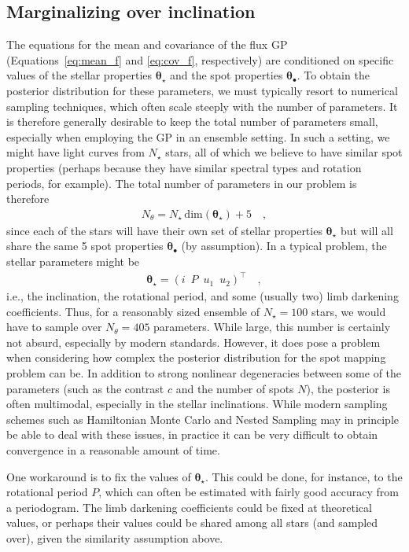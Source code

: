 \documentclass[modern]{aastex62}
\begin{document}
\subsection{Marginalizing over inclination}
\label{sec:inclination}
%
The equations for the mean and covariance of the flux GP
(Equations~\ref{eq:mean_f} and \ref{eq:cov_f}, respectively) are conditioned
on specific values of the stellar properties $\pmb{\theta}_\star$ and the
spot properties $\pmb{\theta}_\bullet$. To obtain the posterior distribution
for these parameters, we must typically resort to numerical sampling techniques,
which often scale steeply with the number of parameters. It is therefore generally
desirable to keep the total number of parameters small, especially when
employing the GP in an ensemble setting.
In such a setting, we might have light curves from $N_\star$ stars, all of which
we believe to have similar spot properties (perhaps because they have
similar spectral types and rotation periods, for example).
The total number of parameters in our problem is therefore
%
\begin{align}
    N_\theta = N_\star \, \mathrm{dim}(\pmb{\theta}_\star) + 5
    \quad,
\end{align}
%
since each of the stars will have their own set of stellar properties
$\pmb{\theta}_\star$ but will all share the same 5 spot properties
$\pmb{\theta}_\bullet$ (by assumption).
In a typical problem, the stellar parameters might be
%
\begin{align}
    \pmb{\theta}_\star =
    \left(
    i \,\,\,
    P \,\,\,
    u_1 \,\,\,
    u_2
    \right)^\top
    \quad,
\end{align}
%
i.e., the inclination, the rotational period, and some (usually two) limb
darkening coefficients. Thus, for a reasonably sized ensemble of $N_\star=100$
stars, we would have to sample over $N_\theta = 405$ parameters.
While large, this number is certainly not absurd, especially by modern standards.
However, it does pose
a problem when considering how complex the posterior distribution for the
spot mapping problem can be. In addition to strong nonlinear degeneracies
between some of the parameters (such as the contrast $c$ and the
number of spots $N$), the posterior is often multimodal, especially in the
stellar inclinations. While modern sampling schemes such as Hamiltonian
Monte Carlo and Nested Sampling may in principle be able to deal with these
issues, in practice it can be very difficult to obtain convergence in a
reasonable amount of time.

One workaround is to fix the values of $\pmb{\theta}_\star$. This could be done,
for instance, to the rotational period $P$, which can often be estimated with
fairly good accuracy from a periodogram. The limb darkening coefficients could
be fixed at theoretical values, or perhaps their values could be shared among
all stars (and sampled over), given the similarity assumption above.
\end{document}
